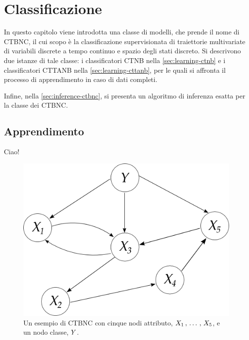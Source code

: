 
\chapter{Classificazione}
\label{cap:ctbnc}
In questo capitolo viene introdotta una classe di modelli, che prende il nome di \acf{CTBNC}, il cui scopo è la classificazione supervisionata di traiettorie multivariate di variabili discrete a tempo continuo e spazio degli stati discreto. Si descrivono due istanze di tale classe: i classificatori \acf{CTNB} nella \autoref{sec:learning-ctnb} e i classificatori \acf{CTTANB} nella \autoref{sec:learning-cttanb}, per le quali si affronta il processo di apprendimento in caso di dati completi.

Infine, nella \autoref{sec:inference-ctbnc}, si presenta un algoritmo di inferenza esatta per la classe dei \acs{CTBNC}.

\section{Apprendimento}
Ciao!

\begin{figure}
\centering
\includegraphics[width=0.9\columnwidth]{immagini/ctbnc}
\caption[Un esempio di \acs{CTBNC}]{Un esempio di \acl{CTBNC} con cinque nodi attributo, $\mathnormal{X}_1\,,\,\dotsc\,,\,\mathnormal{X}_5$, e un nodo classe, $\mathnormal{Y}$.}
\label{fig:ctbnc-example}
\end{figure}

